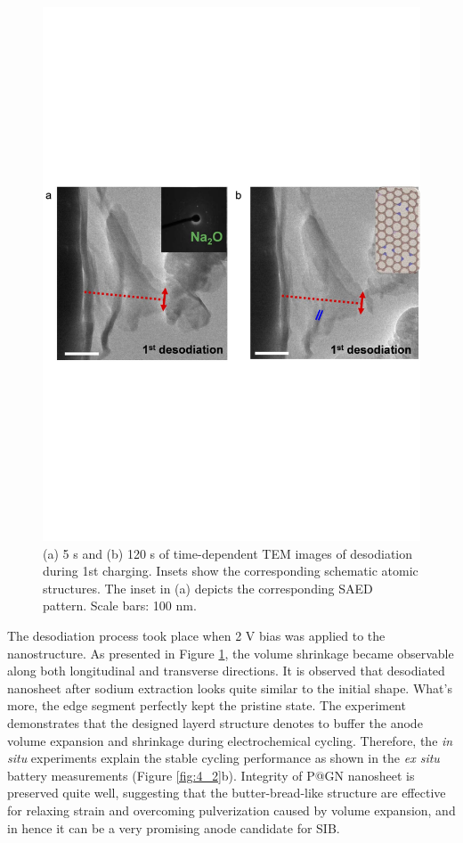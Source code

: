 \begin{figure}  
\includegraphics[width=\textwidth,angle=0]{figures/figure4_3ef}
\caption[{\em in situ} desodiation process on P@GN SIB]
{
  (a) 5 s and (b) 120 s of time-dependent TEM images of desodiation during 1st charging. Insets show the corresponding schematic atomic structures. The inset in (a) depicts the corresponding SAED pattern. Scale bars: 100 nm.
\label{fig:4_3ef}}
\end{figure}

The desodiation process took place when 2 V bias was applied to the nanostructure. As presented in Figure \ref{fig:4_3ef}, the volume shrinkage became observable along both longitudinal and transverse directions. 
It is observed that desodiated nanosheet after sodium extraction looks quite similar to the initial shape. What's more, the edge segment perfectly kept the pristine state. 
The experiment demonstrates that the designed layerd structure denotes to buffer the anode volume expansion and shrinkage during electrochemical cycling. 
Therefore, the {\em in situ} experiments explain the stable cycling performance as shown in the {\em ex situ} battery measurements (Figure \ref{fig:4_2}b). 
Integrity of P@GN nanosheet is preserved quite well, suggesting that the butter-bread-like structure are effective for relaxing strain and overcoming pulverization caused by volume expansion, and in hence it can be a very promising anode candidate for SIB.\\

